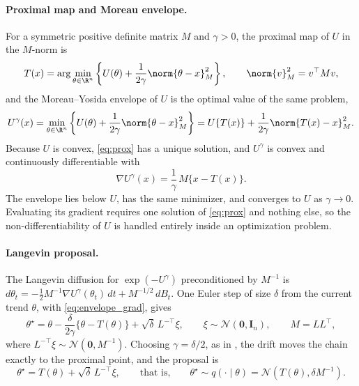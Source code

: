 \paragraph{Proximal map and Moreau envelope.} For a symmetric positive definite matrix $M$ and $\gamma > 0$, the proximal map of $U$ in the $M$-norm is
\begin{equation}
    T(x) = \arg\min_{\theta \in \R^n} \left\{ U(\theta) + \frac{1}{2\gamma}\norm{\theta - x}_M^2 \right\}, \qquad \norm{v}_M^2 = v^\top M v ,
    \label{eq:prox}
\end{equation}
and the Moreau--Yosida envelope of $U$ is the optimal value of the same problem,
\begin{equation}
    U^\gamma(x) = \min_{\theta \in \R^n} \left\{ U(\theta) + \frac{1}{2\gamma}\norm{\theta - x}_M^2 \right\} = U\{T(x)\} + \frac{1}{2\gamma}\norm{T(x) - x}_M^2 .
    \label{eq:envelope}
\end{equation}
Because $U$ is convex, \eqref{eq:prox} has a unique solution, and $U^\gamma$ is convex and continuously differentiable with
\begin{equation}
    \nabla U^\gamma(x) = \frac{1}{\gamma}\, M\{x - T(x)\}.
    \label{eq:envelope_grad}
\end{equation}
The envelope lies below $U$, has the same minimizer, and converges to $U$ as $\gamma \to 0$. Evaluating its gradient requires one solution of \eqref{eq:prox} and nothing else, so the non-differentiability of $U$ is handled entirely inside an optimization problem.

\paragraph{Langevin proposal.} The Langevin diffusion for $\exp(-U^\gamma)$ preconditioned by $M^{-1}$ is $d\theta_t = -\tfrac12 M^{-1}\nabla U^\gamma(\theta_t)\,dt + M^{-1/2}\,dB_t$. One Euler step of size $\delta$ from the current trend $\theta$, with \eqref{eq:envelope_grad}, gives
\[
    \theta^\star = \theta - \frac{\delta}{2\gamma}\{\theta - T(\theta)\} + \sqrt{\delta}\, L^{-\top}\xi, \qquad \xi \sim \mathcal{N}(\mathbf{0}, \mathbf{I}_n), \qquad M = L L^\top,
\]
where $L^{-\top}\xi \sim \mathcal{N}(\mathbf{0}, M^{-1})$. Choosing $\gamma = \delta/2$, as in \citet{pereyra2016proximal}, the drift moves the chain exactly to the proximal point, and the proposal is
\begin{equation}
    \theta^\star = T(\theta) + \sqrt{\delta}\, L^{-\top} \xi, \qquad\text{that is,}\qquad \theta^\star \sim q(\cdot \mid \theta) = \mathcal{N}\!\left(T(\theta), \delta M^{-1}\right).
    \label{eq:pmala_proposal}
\end{equation}

